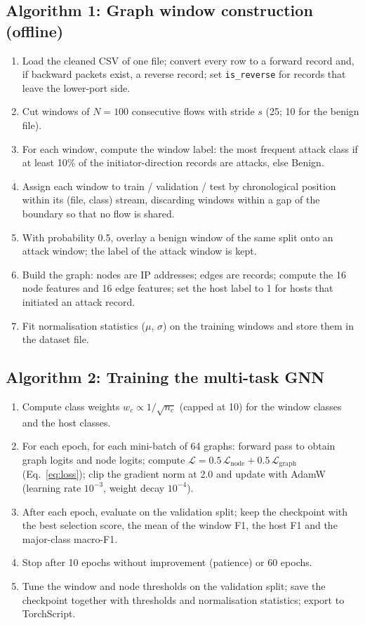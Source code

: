 \subsection{Algorithm 1: Graph window construction (offline)}
\begin{enumerate}[label=\arabic*.]
	\item Load the cleaned CSV of one file; convert every row to a forward record and, if backward packets exist, a reverse record; set \texttt{is\_reverse} for records that leave the lower-port side.
	\item Cut windows of $N=100$ consecutive flows with stride $s$ (25; 10 for the benign file).
	\item For each window, compute the window label: the most frequent attack class if at least 10\% of the initiator-direction records are attacks, else Benign.
	\item Assign each window to train / validation / test by chronological position within its (file, class) stream, discarding windows within a gap of the boundary so that no flow is shared.
	\item With probability 0.5, overlay a benign window of the same split onto an attack window; the label of the attack window is kept.
	\item Build the graph: nodes are IP addresses; edges are records; compute the 16 node features and 16 edge features; set the host label to 1 for hosts that initiated an attack record.
	\item Fit normalisation statistics ($\mu$, $\sigma$) on the training windows and store them in the dataset file.
\end{enumerate}

\subsection{Algorithm 2: Training the multi-task GNN}
\begin{enumerate}[label=\arabic*.]
	\item Compute class weights $w_c\propto 1/\sqrt{n_c}$ (capped at 10) for the window classes and the host classes.
	\item For each epoch, for each mini-batch of 64 graphs: forward pass to obtain graph logits and node logits; compute $\mathcal{L}=0.5\,\mathcal{L}_{\text{node}}+0.5\,\mathcal{L}_{\text{graph}}$ (Eq.~\ref{eq:loss}); clip the gradient norm at 2.0 and update with AdamW \cite{bib:adam} (learning rate $10^{-3}$, weight decay $10^{-4}$).
	\item After each epoch, evaluate on the validation split; keep the checkpoint with the best selection score, the mean of the window F1, the host F1 and the major-class macro-F1.
	\item Stop after 10 epochs without improvement (patience) or 60 epochs.
	\item Tune the window and node thresholds on the validation split; save the checkpoint together with thresholds and normalisation statistics; export to TorchScript.
\end{enumerate}

